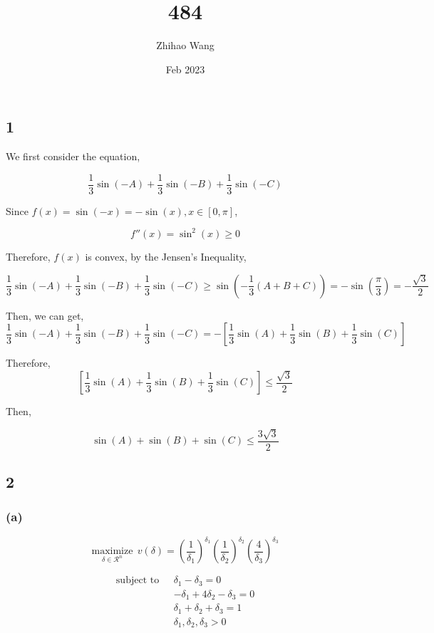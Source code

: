 \documentclass{article}
\title{484}
\author{Zhihao Wang}
\date{Feb 2023}
\begin{document}
\maketitle

\subsection*{1}

We first consider the equation,

$$\frac{1}{3}\sin(-A) +\frac{1}{3} \sin(-B) + \frac{1}{3}\sin(-C)$$

Since $f(x) = \sin(-x) = -\sin(x), x \in [0, \pi]$, 

$$f''(x) = \sin^2(x) \ge 0$$

Therefore, $f(x)$ is convex, by the Jensen's Inequality,

$$\frac{1}{3}\sin(-A) +\frac{1}{3} \sin(-B) + \frac{1}{3}\sin(-C) \ge \sin(-\frac{1}{3}(A + B + C)) = -\sin(\frac{\pi}{3}) = - \frac{\sqrt{3}}{2} $$

Then, we can get,
$$\frac{1}{3}\sin(-A) +\frac{1}{3} \sin(-B) + \frac{1}{3}\sin(-C) = -\left[\frac{1}{3}\sin(A) +\frac{1}{3} \sin(B) + \frac{1}{3}\sin(C) \right]$$


Therefore, 
$$\left[\frac{1}{3}\sin(A) +\frac{1}{3} \sin(B) + \frac{1}{3}\sin(C) \right] \le \frac{\sqrt{3}}{2}$$

Then, 

$$\sin(A) +\sin(B) + \sin(C) \le\frac{3\sqrt{3}}{2} $$


\subsection*{2}

\subsubsection*{(a)}

$$\underset{\delta \in \mathcal{R}^n}{\text{maximize}} \ \  v(\delta) = \left(\frac{1}{\delta_1}\right)^{\delta_1}\left(\frac{1}{\delta_2}\right)^{\delta_2}\left(\frac{4}{\delta_3}\right)^{\delta_3}$$

\[
\begin{split}
\text{subject to}\ \ \ & \delta_1 - \delta_3 = 0 \\ 
& -\delta_1 + 4\delta_2 - \delta_3 = 0 \\ 
& \delta_1 + \delta_2 + \delta_3 = 1 \\
& \delta_1, \delta_2, \delta_3 > 0
\end{split}
\]
\end{document}
